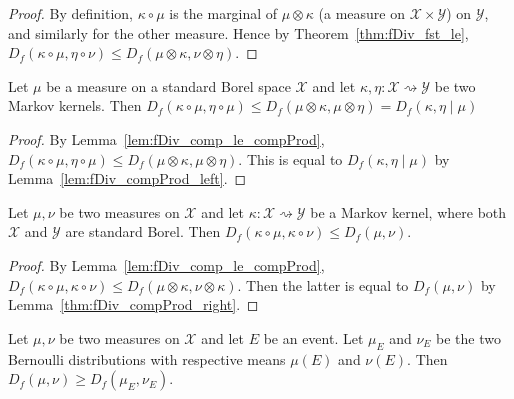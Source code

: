\begin{proof}\leanok
{}
By definition, $\kappa \circ \mu$ is the marginal of $\mu \otimes \kappa$ (a measure on $\mathcal X \times \mathcal Y$) on $\mathcal Y$, and similarly for the other measure. Hence by Theorem~\ref{thm:fDiv_fst_le}, $D_f(\kappa \circ \mu, \eta \circ \nu) \le D_f(\mu \otimes \kappa, \nu \otimes \eta)$. 
\end{proof}

\begin{theorem}
  \label{thm:fDiv_comp_le_condFDiv}
  \leanok
  Let $\mu$ be a measure on a standard Borel space $\mathcal X$ and let $\kappa, \eta : \mathcal X \rightsquigarrow \mathcal Y$ be two Markov kernels.
  Then $D_f(\kappa \circ \mu, \eta \circ \mu) \le D_f(\mu \otimes \kappa, \mu \otimes \eta) = D_f(\kappa, \eta \mid \mu)$
\end{theorem}

\begin{proof}\leanok
{}
By Lemma~\ref{lem:fDiv_comp_le_compProd}, $D_f(\kappa \circ \mu, \eta \circ \mu) \le D_f(\mu \otimes \kappa, \mu \otimes \eta)$. This is equal to $D_f(\kappa, \eta \mid \mu)$ by Lemma~\ref{lem:fDiv_compProd_left}.
\end{proof}

\begin{theorem}
  \label{thm:fDiv_data_proc}
  \leanok
  Let $\mu, \nu$ be two measures on $\mathcal X$ and let $\kappa : \mathcal X \rightsquigarrow \mathcal Y$ be a Markov kernel, where both $\mathcal X$ and $\mathcal Y$ are standard Borel.
  Then $D_f(\kappa \circ \mu, \kappa \circ \nu) \le D_f(\mu, \nu)$.
\end{theorem}

\begin{proof}\leanok
{}
By Lemma~\ref{lem:fDiv_comp_le_compProd}, $D_f(\kappa \circ \mu, \kappa \circ \nu) \le D_f(\mu \otimes \kappa, \nu \otimes \kappa)$. Then the latter is equal to $D_f(\mu, \nu)$ by Lemma~\ref{thm:fDiv_compProd_right}.
\end{proof}


\begin{corollary}
  \label{cor:data_proc_event}
  Let $\mu, \nu$ be two measures on $\mathcal X$ and let $E$ be an event. Let $\mu_E$ and $\nu_E$ be the two Bernoulli distributions with respective means $\mu(E)$ and $\nu(E)$. Then $D_f(\mu, \nu) \ge D_f(\mu_E, \nu_E)$.
\end{corollary}

